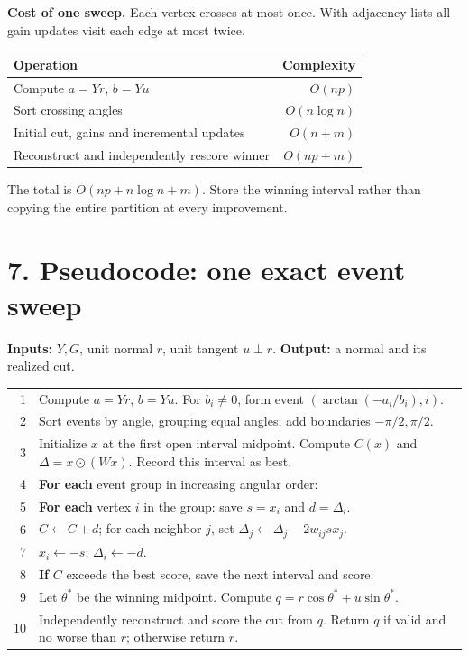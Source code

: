 \documentclass[11pt]{article}
\newcommand{\sect}[1]{\section*{\textcolor{ink}{#1}}}
\begin{document}
\textbf{Cost of one sweep.} Each vertex crosses at most once. With adjacency lists all gain updates visit each edge at most twice.
\begin{center}
\begin{tabular}{@{}lr@{}}\toprule
Operation & Complexity\\\midrule
Compute $a=Yr$, $b=Yu$ & $O(np)$\\
Sort crossing angles & $O(n\log n)$\\
Initial cut, gains and incremental updates & $O(n+m)$\\
Reconstruct and independently rescore winner & $O(np+m)$\\\bottomrule
\end{tabular}
\end{center}
The total is $O(np+n\log n+m)$. Store the winning interval rather than copying the entire partition at every improvement.
\newpage
\sect{7. Pseudocode: one exact event sweep}
\textbf{Inputs:} $Y,G$, unit normal $r$, unit tangent $u\perp r$. \textbf{Output:} a normal and its realized cut.
\begingroup\small
\begin{tabular}{@{}r p{.88\linewidth}@{}}
1 & Compute $a=Yr$, $b=Yu$. For $b_i\ne0$, form event $(\arctan(-a_i/b_i),i)$.\\
2 & Sort events by angle, grouping equal angles; add boundaries $-\pi/2,\pi/2$.\\
3 & Initialize $x$ at the first open interval midpoint. Compute $C(x)$ and $\Delta=x\odot(Wx)$. Record this interval as best.\\
4 & \textbf{For each} event group in increasing angular order:\\
5 & \quad\textbf{For each} vertex $i$ in the group: save $s=x_i$ and $d=\Delta_i$.\\
6 & \qquad $C\leftarrow C+d$; for each neighbor $j$, set $\Delta_j\leftarrow\Delta_j-2w_{ij}s x_j$.\\
7 & \qquad $x_i\leftarrow-s$; $\Delta_i\leftarrow-d$.\\
8 & \quad\textbf{If} $C$ exceeds the best score, save the next interval and score.\\
9 & Let $\theta^*$ be the winning midpoint. Compute $q=r\cos\theta^*+u\sin\theta^*$.\\
10 & Independently reconstruct and score the cut from $q$. Return $q$ if valid and no worse than $r$; otherwise return $r$.\\
\end{tabular}
\endgroup
\end{document}
